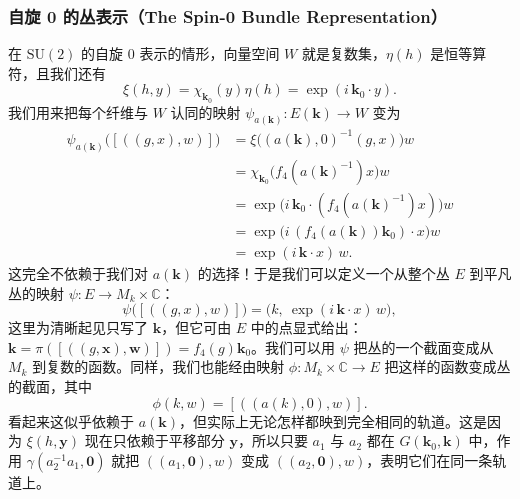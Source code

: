 \subsubsection{自旋 0 的丛表示（The Spin-0 Bundle Representation）}

在 $\mathrm{SU}(2)$ 的自旋 0 表示的情形，向量空间 $W$ 就是复数集，$\eta(h)$ 是恒等算符，且我们还有
\[
\xi(h,y)=\chi_{\mathbf{k}_0}(y)\eta(h)=\exp(i\,\mathbf{k}_0\cdot y).
\]
我们用来把每个纤维与 $W$ 认同的映射 $\psi_{a(\mathbf{k})}:E(\mathbf{k})\to W$ 变为
\begin{align*}
\psi_{a(\mathbf{k})}\big([((g,x),w)]\big)
&=\xi\big((a(\mathbf{k}),0)^{-1}(g,x)\big)w\\
&=\chi_{\mathbf{k}_0}\big(f_4(a(\mathbf{k})^{-1})x\big)w\\
&=\exp\big(i\,\mathbf{k}_0\cdot(f_4(a(\mathbf{k})^{-1})x)\big)w\\
&=\exp\big(i\,(f_4(a(\mathbf{k}))\mathbf{k}_0)\cdot x\big)w\\
&=\exp(i\,\mathbf{k}\cdot x)\,w .
\end{align*}
这完全不依赖于我们对 $a(\mathbf{k})$ 的选择！于是我们可以定义一个从整个丛 $E$ 到平凡丛的映射 $\psi:E\to M_k\times\mathbb{C}$：
\[
\psi\big([((g,x),w)]\big)=\big(k,\ \exp(i\,\mathbf{k}\cdot x)\,w\big),
\]
这里为清晰起见只写了 $\mathbf{k}$，但它可由 $E$ 中的点显式给出：$\mathbf{k}=\pi([((g,\mathbf{x}),\mathbf{w})])=f_4(g)\mathbf{k}_0$。我们可以用 $\psi$ 把丛的一个截面变成从 $M_k$ 到复数的函数。同样，我们也能经由映射 $\phi:M_k\times\mathbb{C}\to E$ 把这样的函数变成丛的截面，其中
\[
\phi(k,w)=[((a(k),0),w)].
\]
看起来这似乎依赖于 $a(\mathbf{k})$，但实际上无论怎样都映到完全相同的轨道。这是因为 $\xi(h,\mathbf{y})$ 现在只依赖于平移部分 $\mathbf{y}$，所以只要 $a_1$ 与 $a_2$ 都在 $G(\mathbf{k}_0,\mathbf{k})$ 中，作用 $\gamma(a_2^{-1}a_1,\mathbf{0})$ 就把 $((a_1,\mathbf{0}),w)$ 变成 $((a_2,\mathbf{0}),w)$，表明它们在同一条轨道上。

